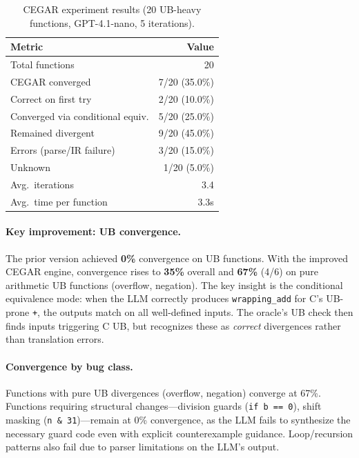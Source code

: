 \documentclass[11pt]{article}
\begin{document}
\begin{table}[t]
\centering
\caption{CEGAR experiment results (20 UB-heavy functions, GPT-4.1-nano,
         5 iterations).}\label{tab:cegar}
\begin{tabular}{@{}lr@{}}
\toprule
\textbf{Metric} & \textbf{Value} \\
\midrule
Total functions              & 20 \\
CEGAR converged              & 7/20 (35.0\%) \\
\quad Correct on first try   & 2/20 (10.0\%) \\
\quad Converged via conditional equiv. & 5/20 (25.0\%) \\
Remained divergent           & 9/20 (45.0\%) \\
Errors (parse/IR failure)    & 3/20 (15.0\%) \\
Unknown                      & 1/20 (5.0\%) \\
\midrule
Avg.\ iterations             & 3.4 \\
Avg.\ time per function      & 3.3s \\
\bottomrule
\end{tabular}
\end{table}

\paragraph{Key improvement: UB convergence.}
The prior version achieved \textbf{0\%} convergence on UB functions.
With the improved CEGAR engine, convergence rises to \textbf{35\%} overall
and \textbf{67\%} (4/6) on pure arithmetic UB functions (overflow, negation).
The key insight is the conditional equivalence mode: when the LLM correctly
produces \texttt{wrapping\_add} for C's UB-prone \texttt{+}, the outputs
match on all well-defined inputs.  The oracle's UB check then finds
inputs triggering C UB, but recognizes these as \emph{correct} divergences
rather than translation errors.

\paragraph{Convergence by bug class.}
Functions with pure UB divergences (overflow, negation) converge at 67\%.
Functions requiring structural changes---division guards
(\texttt{if b == 0}), shift masking (\texttt{n \& 31})---remain at 0\%
convergence, as the LLM fails to synthesize the necessary guard code
even with explicit counterexample guidance.  Loop/recursion patterns
also fail due to parser limitations on the LLM's output.
\end{document}
